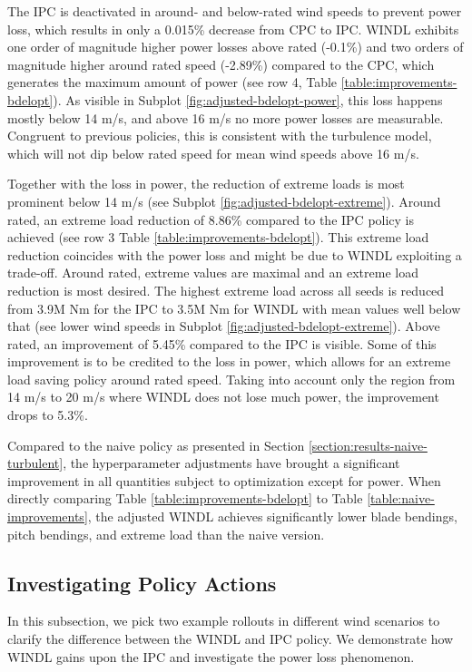 The IPC is deactivated in around- and below-rated wind speeds to prevent power loss, which results in only a 0.015\% decrease from CPC to IPC. WINDL exhibits one order of magnitude higher power losses above rated (-0.1\%) and two orders of magnitude higher around rated speed (-2.89\%) compared to the CPC, which generates the maximum amount of power (see row 4, Table \ref{table:improvements-bdelopt}). As visible in Subplot \ref{fig:adjusted-bdelopt-power}, this loss happens mostly below 14 m/s, and above 16 m/s no more power losses are measurable. Congruent to previous policies, this is consistent with the turbulence model, which will not dip below rated speed for mean wind speeds above 16 m/s.

Together with the loss in power, the reduction of extreme loads is most prominent below 14 m/s (see Subplot \ref{fig:adjusted-bdelopt-extreme}). Around rated, an extreme load reduction of 8.86\% compared to the IPC policy is achieved (see row 3 Table \ref{table:improvements-bdelopt}). This extreme load reduction coincides with the power loss and might be due to WINDL exploiting a trade-off. Around rated, extreme values are maximal and an extreme load reduction is most desired. The highest extreme load across all seeds is reduced from 3.9M Nm for the IPC to 3.5M Nm for WINDL with mean values well below that (see lower wind speeds in Subplot \ref{fig:adjusted-bdelopt-extreme}). Above rated, an improvement of 5.45\% compared to the IPC is visible. Some of this improvement is to be credited to the loss in power, which allows for an extreme load saving policy around rated speed. Taking into account only the region from 14 m/s to 20 m/s where WINDL does not lose much power, the improvement drops to 5.3\%.

Compared to the naive policy as presented in Section \ref{section:results-naive-turbulent}, the hyperparameter adjustments have brought a significant improvement in all quantities subject to optimization except for power. When directly comparing Table \ref{table:improvements-bdelopt} to Table \ref{table:naive-improvements}, the adjusted WINDL achieves significantly lower blade bendings, pitch bendings, and extreme load than the naive version.

\subsection{Investigating Policy Actions}

In this subsection, we pick two example rollouts in different wind scenarios to clarify the difference between the WINDL and IPC policy. We demonstrate how WINDL gains upon the IPC and investigate the power loss phenomenon.

